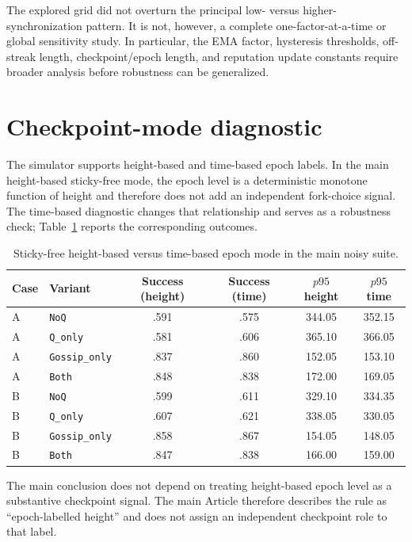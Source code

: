 \documentclass[11pt]{article}
\begin{document}
The explored grid did not overturn the principal low- versus higher-synchronization pattern. It is not, however, a complete one-factor-at-a-time or global sensitivity study. In particular, the EMA factor, hysteresis thresholds, off-streak length, checkpoint/epoch length, and reputation update constants require broader analysis before robustness can be generalized.

\section{Checkpoint-mode diagnostic}
The simulator supports height-based and time-based epoch labels. In the main height-based sticky-free mode, the epoch level is a deterministic monotone function of height and therefore does not add an independent fork-choice signal. The time-based diagnostic changes that relationship and serves as a robustness check; Table~\ref{tab:checkpoint-mode} reports the corresponding outcomes.

\begin{table}[H]
\centering
\caption{Sticky-free height-based versus time-based epoch mode in the main noisy suite.}
\label{tab:checkpoint-mode}
\scriptsize
\begin{tabular}{llcccc}
\toprule
Case & Variant & Success (height) & Success (time) & $p95$ height & $p95$ time\\
\midrule
A & \texttt{NoQ} & .591 & .575 & 344.05 & 352.15\\
A & \texttt{Q\_only} & .581 & .606 & 365.10 & 366.05\\
A & \texttt{Gossip\_only} & .837 & .860 & 152.05 & 153.10\\
A & \texttt{Both} & .848 & .838 & 172.00 & 169.05\\
B & \texttt{NoQ} & .599 & .611 & 329.10 & 334.35\\
B & \texttt{Q\_only} & .607 & .621 & 338.05 & 330.05\\
B & \texttt{Gossip\_only} & .858 & .867 & 154.05 & 148.05\\
B & \texttt{Both} & .847 & .838 & 166.00 & 159.00\\
\bottomrule
\end{tabular}
\end{table}

The main conclusion does not depend on treating height-based epoch level as a substantive checkpoint signal. The main Article therefore describes the rule as ``epoch-labelled height'' and does not assign an independent checkpoint role to that label.
\end{document}
